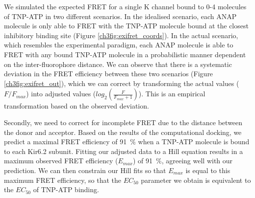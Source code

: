 We simulated the expected FRET for a single K\ATP{} channel bound to 0-4 molecules of TNP-ATP in two different scenarios.
In the idealised scenario, each ANAP molecule is only able to FRET with the TNP-ATP molecule bound at the closest inhibitory binding site (Figure \ref{ch3fig:exifret_coords}).
In the actual scenario, which resembles the experimental paradigm, each ANAP molecule is able to FRET with any bound TNP-ATP molecule in a probabilistic manner dependent on the inter-fluorophore distance.
We can observe that there is a systematic deviation in the FRET efficiency between these two scenarios (Figure \ref{ch3fig:exifret_out}), which we can correct by transforming the actual values ($F/F_{max}$) into adjusted values ($log_2(\frac{F}{F_{max} + 1})$).
This is an empirical transformation based on the observed deviation.

Secondly, we need to correct for incomplete FRET due to the distance between the donor and acceptor.
Based on the results of the computational docking, we predict a maximal FRET efficiency of \SI{91}{\percent} when a TNP-ATP molecule is bound to each Kir6.2 subunit.
Fitting our adjusted data to a Hill equation results in a maximum observed FRET efficiency ($E_{max}$) of \SI{91}{\percent}, agreeing well with our prediction.
We can then constrain our Hill fits so that $E_{max}$ is equal to this maximum FRET efficiency, so that the $EC_{50}$ parameter we obtain is equivalent to the $EC_{50}$ of TNP-ATP binding.

